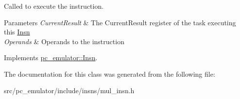 Called to execute the instruction. 


\begin{DoxyParams}{Parameters}
{\em Current\+Result} & The Current\+Result register of the task executing this \hyperlink{classpc__emulator_1_1Insn}{Insn} \\
\hline
{\em Operands} & Operands to the instruction \\
\hline
\end{DoxyParams}


Implements \hyperlink{classpc__emulator_1_1Insn_a103d27030e872a799e313df16c1f3d66}{pc\+\_\+emulator\+::\+Insn}.



The documentation for this class was generated from the following file\+:\begin{DoxyCompactItemize}
\item 
src/pc\+\_\+emulator/include/insns/mul\+\_\+insn.\+h\end{DoxyCompactItemize}

